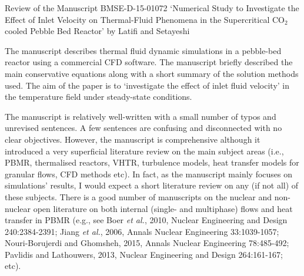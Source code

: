 \documentclass[14pt,twoside]{report}
\begin{document}


\clearpage





\begin{center}
  {\Large Review of the Manuscript BMSE-D-15-01072 `Numerical Study to Investigate the Effect of Inlet Velocity on Thermal-Fluid Phenomena in the Supercritical CO$_{2}$ cooled Pebble Bed Reactor' by Latifi and Setayeshi}
\end{center}

\medskip

The manuscript describes thermal fluid dynamic simulations in a pebble-bed reactor using a commercial CFD software. The manuscript briefly described the main conservative equations along with a short summary of the solution methods used. The aim of the paper is to `investigate the effect of inlet fluid velocity' in the temperature field under steady-state conditions.

The manuscript is relatively well-written with a small number of typos and unrevised sentences. A few sentences are confusing and disconnected with no clear objectives.  However, the manuscript is comprehensive although it introduced a very superficial literature review on the main subject areas (i.e., PBMR, thermalised reactors, VHTR, turbulence models, heat transfer models for granular flows, CFD methods etc). In fact, as the manuscript mainly focuses on simulations' results, I would expect a short literature review on any (if not all) of these subjects. There is a good number of manuscripts on the nuclear and non-nuclear open literature on both internal (single- and multiphase) flows and heat transfer in PBMR (e.g., see Boer {\it et al.}, 2010, Nuclear Engineering and Design 240:2384-2391; Jiang {\it et al.}, 2006, Annals Nuclear Engineering 33:1039-1057; Nouri-Borujerdi and Ghomsheh, 2015, Annals Nuclear Engineering 78:485-492; Pavlidis and Lathouwers, 2013, Nuclear Engineering and Design 264:161-167; etc).
\end{document}
